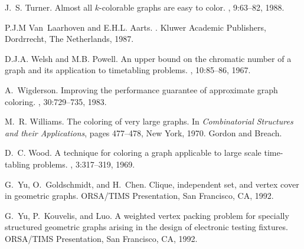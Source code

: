 \begin{thebibliography}{10}
J.~S. Turner.
\newblock Almost all $k$-colorable graphs are easy to color.
, 9:63--82, 1988.

P.J.M Van~Laarhoven and E.H.L. Aarts.
.
\newblock Kluwer Academic Publishers, Dordrrecht, The Netherlands, 1987.

D.J.A. Welsh and M.B. Powell.
\newblock An upper bound on the chromatic number of a graph and its application
  to timetabling problems.
, 10:85--86, 1967.

A.~Wigderson.
\newblock Improving the performance guarantee of approximate graph coloring.
,
  30:729--735, 1983.

M.~R. Williams.
\newblock The coloring of very large graphs.
\newblock In {\em Combinatorial Structures and their Applications}, pages
  477--478, New York, 1970. Gordon and Breach.

D.~C. Wood.
\newblock A technique for coloring a graph applicable to large scale
  time-tabling problems.
, 3:317--319, 1969.

G.~Yu, O.~Goldschmidt, and H.~Chen.
\newblock Clique, independent set, and vertex cover in geometric graphs.
\newblock ORSA/TIMS Presentation, San Francisco, CA, 1992.

G.~Yu, P.~Kouvelis, and Luo.
\newblock A weighted vertex packing problem for specially structured geometric
  graphs arising in the design of electronic testing fixtures.
\newblock ORSA/TIMS Presentation, San Francisco, CA, 1992.

\end{thebibliography}




